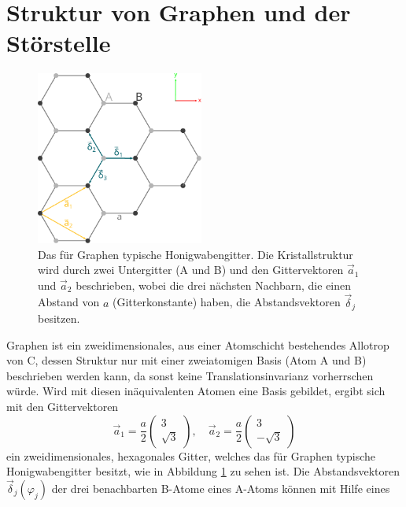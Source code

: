 \section{Struktur von Graphen und der Störstelle}
\label{sec:structure}
\begin{figure}
    \centering
    \includegraphics[width = 0.49\textwidth]{Plots/graphene_lattice.pdf}
    \caption{Das für Graphen typische Honigwabengitter. Die Kristallstruktur wird durch zwei Untergitter (A und B) und den 
    Gittervektoren $\vec{a}_1$ und $\vec{a}_2$ beschrieben, wobei
    die drei nächsten Nachbarn, die einen Abstand von $a$ (Gitterkonstante) haben, die Abstandsvektoren $\vec{\delta}_j$ besitzen.}
    \label{fig:graphene_lattice}
\end{figure}
Graphen ist ein zweidimensionales, aus einer Atomschicht bestehendes Allotrop von C, dessen
Struktur nur mit einer zweiatomigen Basis (Atom A und B) beschrieben werden kann, da sonst keine Translationsinvarianz vorherrschen würde.
Wird mit diesen inäquivalenten Atomen eine Basis gebildet, ergibt sich mit den Gittervektoren 
\begin{equation*}
        \vec{a}_1 = \frac{a}{2}\begin{pmatrix} 3 \\[4pt] \sqrt{3}  \end{pmatrix}, \quad
        \vec{a}_2 = \frac{a}{2}\begin{pmatrix} 3 \\[4pt] -\sqrt{3} \end{pmatrix}       
\end{equation*}    
ein zweidimensionales, hexagonales Gitter, welches das für Graphen typische Honigwabengitter besitzt,
wie in Abbildung \ref{fig:graphene_lattice} zu sehen ist.
Die Abstandsvektoren $\vec{\delta}_j(\varphi_j)$ der drei benachbarten B-Atome eines A-Atoms können mit Hilfe eines 
